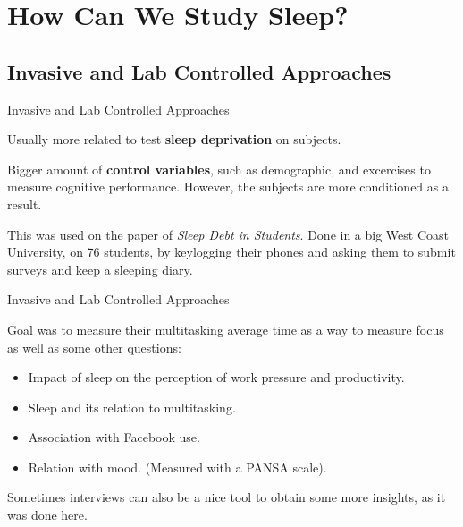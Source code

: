\documentclass{beamer}
\begin{document}
\section{How Can We Study Sleep?}

\subsection{Invasive and Lab Controlled Approaches}

\begin{frame}{Invasive and Lab Controlled Approaches}

Usually more related to test \textbf{sleep deprivation} on subjects. \\

\medskip

Bigger amount of \textbf{control variables}, such as demographic, and excercises to measure cognitive performance. However, the subjects are more conditioned as a result. \\

\medskip

This was used on the paper of \textit{Sleep Debt in Students}. Done in a big West Coast University, on 76 students, by keylogging their phones and asking them to submit surveys and keep a sleeping diary. \\ 

\end{frame}

\begin{frame}{Invasive and Lab Controlled Approaches }

Goal was to measure their multitasking average time as a way to measure focus as well as some other questions:

\begin{itemize}
    \item Impact of sleep on the perception of work pressure and productivity.
    \item Sleep and its relation to multitasking.
    \item Association with Facebook use.
    \item Relation with mood. (Measured with a PANSA scale).
\end{itemize}

\medskip

Sometimes interviews can also be a nice tool to obtain some more insights, as it was done here.
    
\end{frame}
\end{document}
